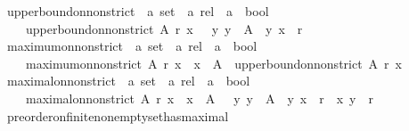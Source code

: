 \begin{isabellebody}
\ upper{\isacharunderscore}bound{\isacharunderscore}on{\isacharunderscore}non{\isacharunderscore}strict\ {\isacharcolon}{\isacharcolon}\ {\isachardoublequoteopen}{\isacharprime}a\ set\ {\isasymRightarrow}\ {\isacharprime}a\ rel\ {\isasymRightarrow}\ {\isacharprime}a\ {\isasymRightarrow}\ bool{\isachardoublequoteclose}\isanewline
\ \ \ \isanewline
\ \ \ \ {\isachardoublequoteopen}upper{\isacharunderscore}bound{\isacharunderscore}on{\isacharunderscore}non{\isacharunderscore}strict\ A\ r\ x\ {\isacharequal}\ {\isacharparenleft}{\isasymforall}\ y{\isachardot}\ y\ {\isasymin}\ A\ {\isasymlongrightarrow}\ {\isacharparenleft}y{\isacharcomma}\ x{\isacharparenright}\ {\isasymin}\ r{\isacharparenright}{\isachardoublequoteclose}\isanewline
\isanewline
{}\isamarkupfalse%
\ maximum{\isacharunderscore}on{\isacharunderscore}non{\isacharunderscore}strict\ {\isacharcolon}{\isacharcolon}\ {\isachardoublequoteopen}{\isacharprime}a\ set\ {\isasymRightarrow}\ {\isacharprime}a\ rel\ {\isasymRightarrow}\ {\isacharprime}a\ {\isasymRightarrow}\ bool{\isachardoublequoteclose}\isanewline
\ \ \ \isanewline
\ \ \ \ {\isachardoublequoteopen}maximum{\isacharunderscore}on{\isacharunderscore}non{\isacharunderscore}strict\ A\ r\ x\ {\isacharequal}\ {\isacharparenleft}x\ {\isasymin}\ A\ {\isasymand}\ upper{\isacharunderscore}bound{\isacharunderscore}on{\isacharunderscore}non{\isacharunderscore}strict\ A\ r\ x{\isacharparenright}{\isachardoublequoteclose}\ \isanewline
\isanewline
{}\isamarkupfalse%
\ maximal{\isacharunderscore}on{\isacharunderscore}non{\isacharunderscore}strict\ {\isacharcolon}{\isacharcolon}\ {\isachardoublequoteopen}{\isacharprime}a\ set\ {\isasymRightarrow}\ {\isacharprime}a\ rel\ {\isasymRightarrow}\ {\isacharprime}a\ {\isasymRightarrow}\ bool{\isachardoublequoteclose}\isanewline
\ \ \ \isanewline
\ \ \ \ {\isachardoublequoteopen}maximal{\isacharunderscore}on{\isacharunderscore}non{\isacharunderscore}strict\ A\ r\ x\ {\isacharequal}\ {\isacharparenleft}x\ {\isasymin}\ A\ {\isasymand}\ {\isacharparenleft}{\isasymforall}\ y{\isachardot}\ y\ {\isasymin}\ A\ {\isasymlongrightarrow}\ {\isacharparenleft}y{\isacharcomma}\ x{\isacharparenright}\ {\isasymin}\ r\ {\isasymor}\ {\isacharparenleft}x{\isacharcomma}\ y{\isacharparenright}\ {\isasymnotin}\ r{\isacharparenright}{\isacharparenright}{\isachardoublequoteclose}\isanewline
\isanewline
{}\isamarkupfalse%
\ preorder{\isacharunderscore}on{\isacharunderscore}finite{\isacharunderscore}non{\isacharunderscore}empty{\isacharunderscore}set{\isacharunderscore}has{\isacharunderscore}maximal\ {\isacharcolon}\isanewline

\end{isabellebody}
